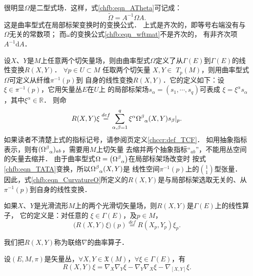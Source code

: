 很明显$\Omega$是二型式场．这样，式\eqref{chfb:eqn_ATheta}可记成：
\begin{equation}\label{chfb:eqn_TATA}
    \widetilde{\Omega} =A^{-1} \Omega A .
\end{equation}
这是曲率型式在局部标架变换时的变换公式．
上式是齐次的，即等号右端没有与$\Omega$无关的常数项；
而$\omega$的变换公式\eqref{chfb:eqn_wftmat}不是齐次的，
有非齐次项$A^{-1} \mathrm{d}A$．


设$X$、$Y$是$M$上任意两个切矢量场，则由曲率型式$\Omega$定义了从$\Gamma(E)$到$\Gamma(E)$的线性变换$R(X, Y)$．
$\forall p \in U\subset M$ 任取两个切矢量 $X, Y \in$ $T_p(M)$，则用曲率型式$\Omega$可定义从纤维$\pi^{-1}(p)$到
自身的线性变換$R(X, Y)$．它的定义如下：设 $\xi \in \pi^{-1}(p)$，它用矢量丛$E$在$U$上
的局部标架场$s_\alpha=\left(s_1, \cdots, s_q\right)$可表成
$\xi = \xi^\alpha s_{\alpha}$，其中$\xi^\alpha \in \mathbb{R}$．
则命
\begin{equation}\label{chfb:eqn_CurvatureO}
    R(X, Y) \xi \overset{def}{=}\sum_{\alpha, \beta=1}^q \xi^\alpha 
    \Omega_{\hphantom{\alpha}\alpha}^\beta(X, Y) s_{\beta}|_p .
\end{equation}
如果读者不清楚上式的指标记号，请参阅\pageref{chccr:def_TCF}页定义\ref{chccr:def_TCF}．
如用抽象指标表示，则有$(\Omega_{\hphantom{\alpha}\alpha}^\beta)_{ab}$，需要用$M$上切矢量
去缩并两个抽象指标“${}_{ab}$”，不能用丛空间的矢量去缩并．
由于曲率型式$\Omega=\left(\Omega_{\hphantom{\alpha}\alpha}^\beta\right)$在局部标架场改变时
按式\eqref{chfb:eqn_TATA}变换，所以$\Omega_{\hphantom{\alpha}\alpha}^\beta(X, Y)$是
线性空间$\pi^{-1}(p)$上的$\binom{1}{1}$型张量．
因此，式\eqref{chfb:eqn_CurvatureO}所定义的$R(X, Y)$是与局部标架选取无关的、从$\pi^{-1}(p)$到自身的线性变换．

如果$X$、$Y$是光滑流形$M$上的两个光滑切矢量场，则$R(X, Y)$是$\Gamma(E)$上的线性算子，
它的定义是：对任意的 $\xi \in \Gamma(E)$，及$p \in  M$，
\begin{equation}\label{chfb:eqn_RppR}
    \bigl(R(X, Y) \xi \bigr)(p)\overset{def}{=}R\left(X_p, Y_p\right) \xi_p .
\end{equation}

我们把$R(X, Y)$称为联络$\nabla$的{\heiti 曲率算子}．

\begin{theorem}\label{chfb:thm_Riemann-Curvature}
    设$(E,M,\pi)$是矢量丛，$\forall X, Y\in \mathfrak{X}(M)$，$\forall \xi \in \Gamma(E)$，有
    \begin{equation}\label{chfb:eqn_Riemann-Curvature}
       R(X, Y)\xi=\nabla_X \nabla_Y\xi- \nabla_Y \nabla_X\xi-\nabla_{[X, Y]}\xi .
    \end{equation}
\end{theorem}

